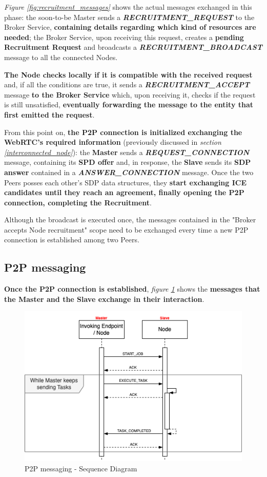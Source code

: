 \textit{Figure \ref{fig:recruitment_messages}} shows the actual messages exchanged in this phase: the soon-to-be Master sends a \textbf{\textit{RECRUITMENT\_REQUEST}} to the Broker Service, \textbf{containing details regarding which kind of resources are needed}; the Broker Service, upon receiving this request, creates a \textbf{pending Recruitment Request} and broadcasts a \textbf{\textit{RECRUITMENT\_BROADCAST}} message to all the connected Nodes.

\textbf{The Node checks locally if it is compatible with the received request} and, if all the conditions are true, it sends a \textit{\textbf{RECRUITMENT\_ACCEPT}} message \textbf{to the Broker Service} which, upon receiving it, checks if the request is still unsatisfied, \textbf{eventually forwarding the message to the entity that first emitted the request}.

From this point on, \textbf{the P2P connection is initialized exchanging the WebRTC's required information} (previously discussed in \textit{section \ref{interconnected_node}}): the \textbf{Master} sends a \textbf{\textit{REQUEST\_CONNECTION}} message, containing its \textbf{SPD offer} and, in response, the \textbf{Slave} sends its \textbf{SDP answer} contained in a \textbf{\textit{ANSWER\_CONNECTION}} message. Once the two Peers posses each other's SDP data structures, they \textbf{start exchanging ICE candidates until they reach an agreement, finally opening the P2P connection, completing the Recruitment}.

Although the broadcast is executed once, the messages contained in the "Broker accepts Node recruitment" scope need to be exchanged every time a new P2P connection is established among two Peers.

\subsection{P2P messaging}
\textbf{Once the P2P connection is established}, \textit{figure \ref{fig:p2p_messages}} shows the \textbf{messages that the Master and the Slave exchange in their interaction}.

\begin{figure}[!ht]
    \centering
    \includegraphics[scale=0.61]{document/chapters/chapter_7/images/p2p_messages.png}
    \caption{P2P messaging - Sequence Diagram}
    \label{fig:p2p_messages}
\end{figure}

